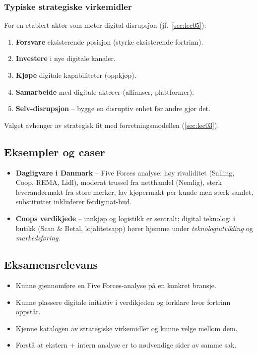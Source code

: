
\subsubsection*{Typiske strategiske virkemidler}
For en etablert aktør som møter digital disrupsjon (jf.\ \autoref{sec:lec05}):
\begin{enumerate}
  \item \textbf{Forsvare} eksisterende posisjon (styrke eksisterende fortrinn).
  \item \textbf{Investere} i nye digitale kanaler.
  \item \textbf{Kjøpe} digitale kapabiliteter (oppkjøp).
  \item \textbf{Samarbeide} med digitale aktører (allianser, plattformer).
  \item \textbf{Selv-disrupsjon} -- bygge en disruptiv enhet før andre gjør det.
\end{enumerate}
Valget avhenger av strategisk fit med forretningsmodellen (\autoref{sec:lec03}).

\subsection{Eksempler og caser}
\begin{itemize}
  \item \textbf{Dagligvare i Danmark} -- Five Forces analyse: høy rivaliditet
    (Salling, Coop, REMA, Lidl), moderat trussel fra netthandel (Nemlig),
    sterk leverandørmakt fra store merker, lav kjøpermakt per kunde men
    sterk samlet, substitutter inkluderer ferdigmat-bud.
  \item \textbf{Coops verdikjede} -- innkjøp og logistikk er sentralt;
    digital teknologi i butikk (Scan \& Betal, lojalitetsapp) hører hjemme
    under \emph{teknologiutvikling} og \emph{markedsføring}.
\end{itemize}

\subsection{Eksamensrelevans}
\begin{itemize}
  \item Kunne gjennomføre en Five Forces-analyse på en konkret bransje.
  \item Kunne plassere digitale initiativ i verdikjeden og forklare hvor
    fortrinn oppstår.
  \item Kjenne katalogen av strategiske virkemidler og kunne velge mellom dem.
  \item Forstå at ekstern + intern analyse er to nødvendige sider av samme sak.
\end{itemize}

